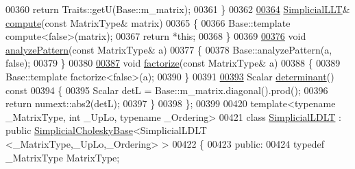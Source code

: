 \begin{DoxyCode}
00360         \textcolor{keywordflow}{return} Traits::getU(Base::m\_matrix);
00361     \}
00362     
\hyperlink{group___sparse_cholesky___module_a24ffa253377a1cec7a44b856fae1f71a}{00364}     \hyperlink{group___sparse_cholesky___module_class_eigen_1_1_simplicial_l_l_t}{SimplicialLLT}& \hyperlink{group___sparse_cholesky___module_a24ffa253377a1cec7a44b856fae1f71a}{compute}(\textcolor{keyword}{const} MatrixType& matrix)
00365     \{
00366       Base::template compute<false>(matrix);
00367       \textcolor{keywordflow}{return} *\textcolor{keyword}{this};
00368     \}
00369 
\hyperlink{group___sparse_cholesky___module_ad6e49b1c0d2ec5c8e118538260f3002c}{00376}     \textcolor{keywordtype}{void} \hyperlink{group___sparse_cholesky___module_ad6e49b1c0d2ec5c8e118538260f3002c}{analyzePattern}(\textcolor{keyword}{const} MatrixType& a)
00377     \{
00378       Base::analyzePattern(a, \textcolor{keyword}{false});
00379     \}
00380 
\hyperlink{group___sparse_cholesky___module_a8a140b34b08df74c7426ee29b986b228}{00387}     \textcolor{keywordtype}{void} \hyperlink{group___sparse_cholesky___module_a8a140b34b08df74c7426ee29b986b228}{factorize}(\textcolor{keyword}{const} MatrixType& a)
00388     \{
00389       Base::template factorize<false>(a);
00390     \}
00391 
\hyperlink{group___sparse_cholesky___module_a956595848e6fac7a389d091b3fdc9567}{00393}     Scalar \hyperlink{group___sparse_cholesky___module_a956595848e6fac7a389d091b3fdc9567}{determinant}()\textcolor{keyword}{ const}
00394 \textcolor{keyword}{    }\{
00395       Scalar detL = Base::m\_matrix.diagonal().prod();
00396       \textcolor{keywordflow}{return} numext::abs2(detL);
00397     \}
00398 \};
00399 
00420 \textcolor{keyword}{template}<\textcolor{keyword}{typename} \_MatrixType, \textcolor{keywordtype}{int} \_UpLo, \textcolor{keyword}{typename} \_Ordering>
00421     \textcolor{keyword}{class }\hyperlink{group___sparse_cholesky___module_class_eigen_1_1_simplicial_l_d_l_t}{SimplicialLDLT} : \textcolor{keyword}{public} \hyperlink{group___sparse_cholesky___module_class_eigen_1_1_simplicial_cholesky_base}{SimplicialCholeskyBase}<SimplicialLDLT
      <\_MatrixType,\_UpLo,\_Ordering> >
00422 \{
00423 \textcolor{keyword}{public}:
00424     \textcolor{keyword}{typedef} \_MatrixType MatrixType;

\end{DoxyCode}
